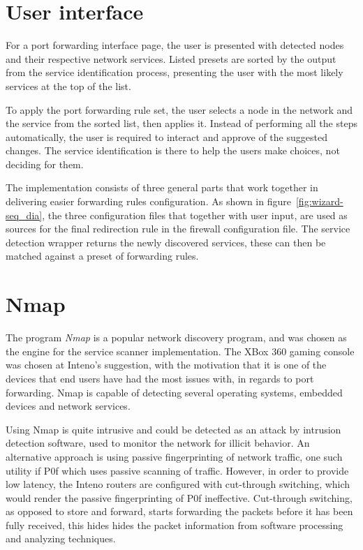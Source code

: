 \documentclass[a4paper,11pt,makeidx]{kth-bcs}
\begin{document}
   \section{User interface}
For a port forwarding interface page, the user is presented with detected nodes and their respective network services.
Listed presets are sorted by the output from the service identification process, presenting the user with the most likely services at the top of the list.

To apply the port forwarding rule set, the user selects a node in the network and the service from the sorted list, then applies it.
Instead of performing all the steps automatically, the user is required to interact and approve of the suggested changes.
The service identification is there to help the users make choices, not deciding for them.


The implementation consists of three general parts that work together in delivering easier forwarding rules configuration.
As shown in figure~\ref{fig:wizard-seq_dia}, the three configuration files that together with user input, are used as sources for the final redirection rule in the firewall configuration file.
The service detection wrapper returns the newly discovered services, these can then be matched against a preset of forwarding rules.


\section{Nmap}
The program \emph{Nmap} is a popular network discovery program, and was chosen as the engine for the service scanner implementation.
The XBox 360 gaming console was chosen at Inteno's suggestion, with the motivation that it is one of the devices that end users have had the most issues with, in regards to port forwarding.
Nmap is capable of detecting several operating systems, embedded devices and network services.

Using Nmap is quite intrusive and could be detected as an attack by intrusion detection software, used to monitor the network for illicit behavior.
An alternative approach is using passive fingerprinting of network traffic, one such utility if P0f which uses passive scanning of traffic.\cite{p0f}
However, in order to provide low latency, the Inteno routers are configured with cut-through switching, which would render the passive fingerprinting of P0f ineffective.
Cut-through switching, as opposed to store and forward, starts forwarding the packets before it has been fully received, this hides hides the packet information from software processing and analyzing techniques.
\end{document}
